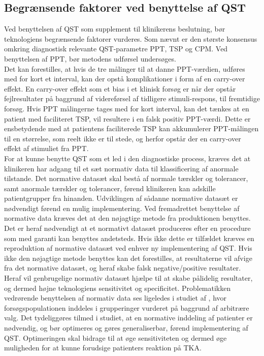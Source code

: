 \subsection{Begrænsende faktorer ved benyttelse af QST}
Ved benyttelsen af QST som supplement til klinikerens beslutning, bør teknologiens begrænsende faktorer vurderes. Som nævnt er den største konsensus omkring diagnostisk relevante QST-parametre PPT, TSP og CPM. Ved benyttelsen af PPT, bør metodens udførsel undersøges. \\
Det kan forestilles, at hvis de tre målinger til at danne PPT-værdien, udføres med for kort et interval, kan der opstå komplikationer i form af en carry-over effekt. En carry-over effekt som et bias i et klinisk forsøg er når der opstår fejlresultater på baggrund af videreførsel af tidligere stimuli-respons, til fremtidige forsøg. Hvis PPT målingerne tages med for kort interval, kan det tænkes at en patient med faciliteret TSP, vil resultere i en falsk positiv PPT-værdi. Dette er ensbetydende med at patientens faciliterede TSP kan akkumulerer PPT-målingen til en størrelse, som reelt ikke er til stede, og herfor opstår der en carry-over effekt af stimuliet fra PPT. \citep{Porta2008}  \\
For at kunne benytte QST som et led i den diagnostiske process, kræves det at klinikeren har adgang til et sæt normativ data til klassificering af anormale tilstande. Det normative datasæt skal bestå af normale tærskler og tolerancer, samt anormale tærskler og tolerancer, førend klinikeren kan adskille patientgrupper fra hinanden. Udviklingen af sådanne normative datasæt er nødvendigt førend en mulig implementering. Ved fremadrettet benyttelse af normative data kræves det at den nøjagtige metode fra produktionen benyttes. Det er heraf nødvendigt at et normativt datasæt produceres efter en procedure som med garanti kan benyttes andetsteds. Hvis ikke dette er tilfældet kræves en reproduktion af normative datasæt ved enhver ny implementering af QST. Hvis ikke den nøjagtige metode benyttes kan det forestilles, at resultaterne vil afvige fra det normative datasæt, og heraf skabe falsk negative/positive resultater. Heraf vil genbrugelige normativ datasæt  hjælpe til at skabe pålidelig resultater, og dermed højne teknologiens sensitivitet og specificitet.  \citep{Yarnitsky1997} Problematikken vedrørende benyttelsen af normativ data ses ligeledes i studiet af , hvor forsøgspopulationen inddeles i grupperinger vurderet på baggrund af arbitrære valg. Det tydeliggøres tilmed i studiet, at en normative inddeling af patienter er nødvendig, og bør optimeres og gøres generaliserbar, førend implementering af QST. Optimeringen skal bidrage til at øge sensitiviteten og dermed øge muligheden for at kunne forudsige patienters reaktion på TKA. \\
